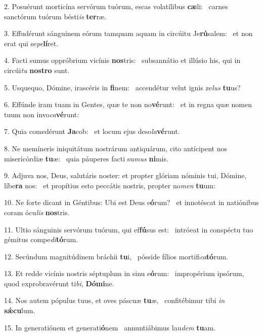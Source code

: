 2. Posuérunt morticína servórum tuórum, escas volatílibus \textbf{cæ}li: \ast\  carnes sanctórum tuórum bésti\textit{is} \textbf{ter}ræ.\

3. Effudérunt sánguinem eórum tamquam aquam in circúitu Je\textbf{rú}salem: \ast\  et non erat qui se\textit{pe}\textbf{lí}ret.\

4. Facti sumus oppróbrium vicínis \textbf{nos}tris: \ast\  subsannátio et illúsio his, qui in circúi\textit{tu} \textbf{nos}\textbf{tro} sunt.\

5. Usquequo, Dómine, irascéris in \textbf{fi}nem: \ast\  accendétur velut ignis ze\textit{lus} \textbf{tu}us?\

6. Effúnde iram tuam in Gentes, quæ te non no\textbf{vé}runt: \ast\  et in regna quæ nomen tuum non invo\textit{ca}\textbf{vé}runt:\

7. Quia comedérunt \textbf{Ja}cob: \ast\  et locum ejus deso\textit{la}\textbf{vé}runt.\

8. Ne memíneris iniquitátum nostrárum antiquárum, cito antícipent nos misericórdiæ \textbf{tu}æ: \ast\  quia páuperes facti su\textit{mus} \textbf{ni}mis.\

9. Adjuva nos, Deus, salutáris noster: et propter glóriam nóminis tui, Dómine, líbe\textbf{ra} nos: \ast\  et propítius esto peccátis nostris, propter no\textit{men} \textbf{tu}um:\

10. Ne forte dicant in Géntibus: Ubi est Deus e\textbf{ó}rum? \ast\  et innotéscat in natiónibus coram ócu\textit{lis} \textbf{nos}tris.\

11. Ultio sánguinis servórum tuórum, qui ef\textbf{fú}sus est: \ast\  intróeat in conspéctu tuo gémitus compe\textit{di}\textbf{tó}rum.\

12. Secúndum magnitúdinem bráchii \textbf{tu}i, \ast\  pósside fílios mortifi\textit{ca}\textbf{tó}rum.\

13. Et redde vicínis nostris séptuplum in sinu e\textbf{ó}rum: \ast\  impropérium ipsórum, quod exprobravérunt ti\textit{bi}, \textbf{Dó}\textbf{mi}ne.\

14. Nos autem pópulus tuus, et oves páscuæ \textbf{tu}æ, \ast\  confitébimur tibi \textit{in} \textbf{sǽ}\textbf{cu}lum.\

15. In generatiónem et generati\textbf{ó}nem \ast\  annuntiábimus lau\textit{dem} \textbf{tu}am.\

